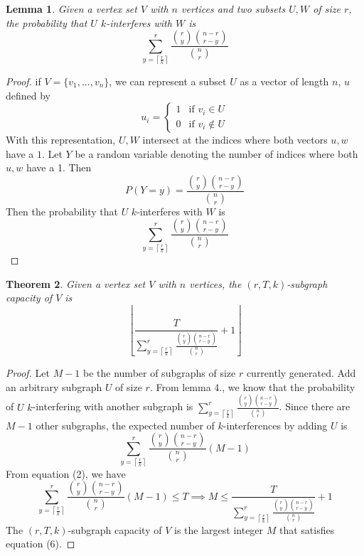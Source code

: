 \documentclass[10pt]{extarticle}
\newtheorem{theorem}{Theorem}
\newtheorem{lemma}[theorem]{Lemma}
\theoremstyle{definition}
\begin{document}
\begin{lemma}
    Given a vertex set $V$ with $n$ vertices and two subsets $U,W$ of size $r$, the probability that $U$ $k$-interferes with $W$ is 
    \begin{equation*}
        \sum_{y = \left\lceil \frac{r}{k} \right\rceil}^{r}  \frac{\binom{r}{y} \binom{n-r}{r-y}}{\binom{n}{r}}
    \end{equation*}
\end{lemma}
\begin{proof}
    if $V = \{v_1,...,v_n\}$, we can represent a subset $U$ as a vector of length $n$, $u$ defined by
    $$
    u_i = \begin{cases}
        1 & \text{if } v_i \in U \\
        0 & \text{if } v_i \notin U
    \end{cases}
    $$
    With this representation, $U,W$ intersect at the indices where both vectors $u, w$ have a $1$. Let $Y$ be a random variable denoting the number of indices where both $u, w$ have a 1. Then 
    \begin{equation}
        P(Y=y) = \frac{\binom{r}{y} \binom{n-r}{r-y}}{\binom{n}{r}}
    \end{equation}
    Then the probability that $U$ $k$-interferes with $W$ is 
    \begin{equation}
        \sum_{y = \left\lceil \frac{r}{k} \right\rceil}^{r}  \frac{\binom{r}{y} \binom{n-r}{r-y}}{\binom{n}{r}}
    \end{equation}
\end{proof}

\begin{theorem}
    Given a vertex set $V$ with $n$ vertices, the $(r,T,k)$-subgraph capacity of $V$ is 
    \begin{equation*}
        \left\lfloor \frac{T}{\sum_{y = \left\lceil \frac{r}{k} \right\rceil}^{r}  \frac{\binom{r}{y} \binom{n-r}{r-y}}{\binom{n}{r}}} + 1 \right\rfloor
    \end{equation*}
\end{theorem}
\begin{proof}
    Let $M-1$ be the number of subgraphs of size $r$ currently generated. Add an arbitrary subgraph $U$ of size $r$. From lemma 4., we know that the probability of $U$ $k$-interfering with another subgraph is $\sum_{y = \left\lceil \frac{r}{k} \right\rceil}^{r}  \frac{\binom{r}{y} \binom{n-r}{r-y}}{\binom{n}{r}}$. Since there are $M-1$ other subgraphs, the expected number of $k$-interferences by adding $U$ is 
    \begin{equation}
        \sum_{y = \left\lceil \frac{r}{k} \right\rceil}^{r}  \frac{\binom{r}{y} \binom{n-r}{r-y}}{\binom{n}{r}} (M-1)
    \end{equation}
    From equation (2), we have 
    \begin{equation}
        \sum_{y = \left\lceil \frac{r}{k} \right\rceil}^{r}  \frac{\binom{r}{y} \binom{n-r}{r-y}}{\binom{n}{r}} (M-1) \le T \implies M \le \frac{T}{\sum_{y = \left\lceil \frac{r}{k} \right\rceil}^{r}  \frac{\binom{r}{y} \binom{n-r}{r-y}}{\binom{n}{r}}} + 1
    \end{equation}
    The $(r,T,k)$-subgraph capacity of $V$ is the largest integer $M$ that satisfies equation (6).
\end{proof}
\end{document}
